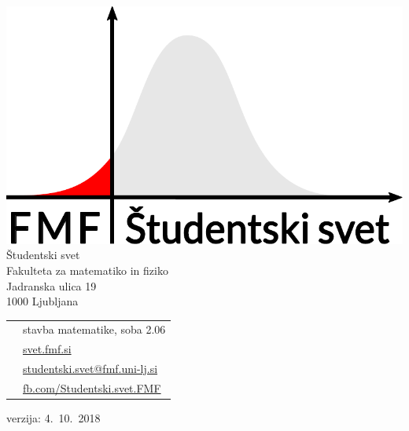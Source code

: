 \documentclass[a4paper,notumble]{leaflet} %
\begin{document}
  \newpage
  \newpage
  {\Large
    
    \includegraphics[width=0.6\linewidth]{ssfmf_logo_col.pdf} \\[1cm]
    
    Študentski svet \\
    Fakulteta za matematiko in fiziko \\
    Jadranska ulica 19 \\
    1000 Ljubljana \\[1cm]
    
    \begin{tabular}{cl}
      \faBuilding{} & stavba matematike, soba 2.06 \\[0.3cm]
      \faGlobe{} & \url{svet.fmf.si} \\[0.3cm]
      \faEnvelopeSquare{} & \url{studentski.svet@fmf.uni-lj.si} \\[0.3cm]
      \faFacebookSquare{} & \url{fb.com/Studentski.svet.FMF}
    \end{tabular}
    
  }
  
  \vfill
  verzija: 4.~10.~2018 
\end{document}
